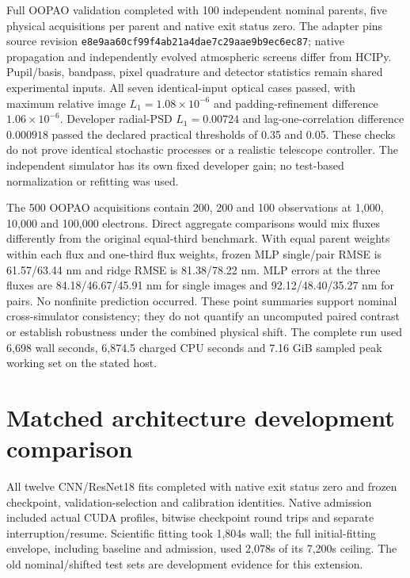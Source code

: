 \documentclass[11pt,a4paper]{article}
\begin{document}
Full OOPAO validation completed with 100 independent nominal parents, five
physical acquisitions per parent and native exit status zero. The adapter pins source revision
\texttt{e8e9aa60cf99f4ab21a4dae7c29aae9b9ec6ec87}; native propagation and
independently evolved atmospheric screens differ from HCIPy. Pupil/basis,
bandpass, pixel quadrature and detector statistics remain shared experimental
inputs. All seven identical-input optical cases passed, with maximum relative
image $L_1=1.08\times10^{-6}$ and padding-refinement difference
$1.06\times10^{-6}$. Developer radial-PSD $L_1=0.00724$ and lag-one-correlation
difference $0.000918$ passed the declared practical thresholds of 0.35 and 0.05.
These checks do not prove identical stochastic processes or a realistic
telescope controller. The independent simulator has its own fixed developer
gain; no test-based normalization or refitting was used.

The 500 OOPAO acquisitions contain 200, 200 and 100 observations at 1,000,
10,000 and 100,000 electrons. Direct aggregate comparisons would mix fluxes
differently from the original equal-third benchmark. With equal parent weights
within each flux and one-third flux weights, frozen MLP single/pair RMSE is
61.57/63.44 nm and ridge RMSE is 81.38/78.22 nm. MLP errors at the three fluxes
are 84.18/46.67/45.91 nm for single images and 92.12/48.40/35.27 nm for pairs.
No nonfinite prediction occurred. These point summaries support nominal
cross-simulator consistency; they do not quantify an uncomputed paired
contrast or establish robustness under the combined physical shift.
The complete run used 6,698 wall seconds, 6,874.5 charged CPU seconds and
7.16 GiB sampled peak working set on the stated host.

\section{Matched architecture development comparison}
All twelve CNN/ResNet18 fits completed with native exit status zero and frozen
checkpoint, validation-selection and calibration identities. Native admission
included actual CUDA profiles, bitwise checkpoint round trips and separate
interruption/resume. Scientific fitting took 1,804s wall; the full initial-fitting
envelope, including baseline and admission, used 2,078s of its 7,200s ceiling.
The old nominal/shifted test sets are development evidence for this extension.
\end{document}

